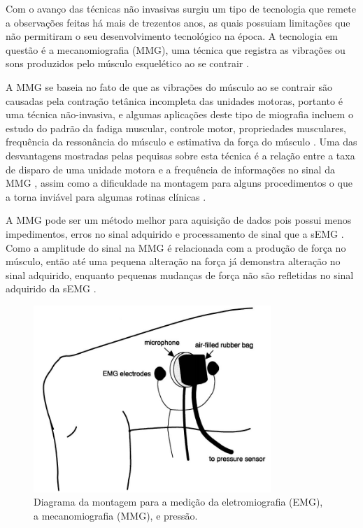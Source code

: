 Com o avanço das técnicas não invasivas surgiu um tipo de tecnologia que remete a observações feitas há mais de trezentos anos, as quais possuiam limitações que não permitiram o seu desenvolvimento tecnológico na época. A tecnologia em questão é a mecanomiografia (MMG), uma técnica que registra as vibrações ou sons produzidos pelo músculo esquelético ao se contrair \cite{vaz1999mecanomiografia} \cite{shinohara1997mechanomyography}.

A MMG se baseia no fato de que as vibrações do músculo ao se contrair são causadas pela contração tetânica incompleta das unidades motoras, portanto é uma técnica não-invasiva, e algumas aplicações deste tipo de miografia incluem o estudo do padrão da fadiga muscular, controle motor, propriedades musculares, frequência da ressonância do músculo e estimativa da força do músculo \cite{shin2016fatigue}. Uma das desvantagens mostradas pelas pequisas sobre esta técnica é a relação entre a taxa de disparo de uma unidade motora e a frequência de informações no sinal da MMG \cite{shin2016fatigue}\cite{shinohara2006mechanomyography}, assim como a dificuldade na montagem para alguns procedimentos o que a torna inviável para algumas rotinas clínicas \cite{hemmerling2004phonomyography}. 

A MMG pode ser um método melhor para aquisição de dados pois possui menos impedimentos, erros no sinal adquirido e processamento de sinal que a sEMG \cite{al2014novel}. Como a amplitude do sinal na MMG é relacionada com a produção de força no músculo, então até uma pequena alteração na força já demonstra alteração no sinal adquirido, enquanto pequenas mudanças de força não são refletidas no sinal adquirido da sEMG \cite{sarillee2014non}.

\begin{figure}[H]
\centering
\includegraphics[width = 0.8\textwidth]{img/Shinohara1997_MMG.JPG}
\caption[Diagrama da Montagem Para Medição da EMG, MMG e Pressão]{Diagrama da montagem para a medição da eletromiografia (EMG), a mecanomiografia (MMG), e pressão\cite{shinohara1997mechanomyography}.}
\label{Shinohara1997_MMG}
\end{figure}
 
